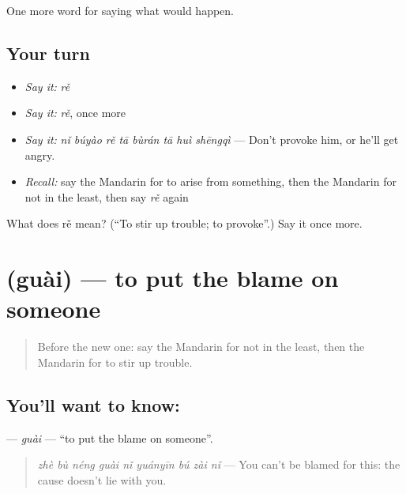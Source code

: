 \begin{grammarlens}[title={What you've built}]
One more word for saying what would happen.
\end{grammarlens}

\subsection*{Your turn}
\begin{itemize}
\raggedright
  \item \emph{Say it:} \emph{rě}
  \item \emph{Say it:} \emph{rě}, once more
  \item \emph{Say it:} \emph{nǐ búyào rě tā bùrán tā huì shēngqì} — Don't provoke him, or he'll get angry.
  \item \emph{Recall:} say the Mandarin for to arise from something, then the Mandarin for not in the least, then say \emph{rě} again
\end{itemize}

\begin{tcolorbox}[breakable,colback=teal!4,colframe=teal!35!black,title={Before you move on}]
What does rě mean? (\textquotedblleft{}To stir up trouble; to provoke\textquotedblright{}.) Say it once more.
\end{tcolorbox}
\section[\texorpdfstring{\zh{怪} (guài)}{怪 (guài)}]{ (guài) — to put the blame on someone}

\label{lesson:ZH-C539-guai-blame}



\begin{quote}
Before the new one: say the Mandarin for not in the least, then the Mandarin for to stir up trouble.
\end{quote}

\subsection*{You'll want to know: }
\textbf{} — \emph{guài} — \textquotedblleft{}to put the blame on someone\textquotedblright{}.

\begin{quote}
\textbf{} \emph{zhè bù néng guài nǐ yuányīn bú zài nǐ} — You can't be blamed for this: the cause doesn't lie with you.
\end{quote}

